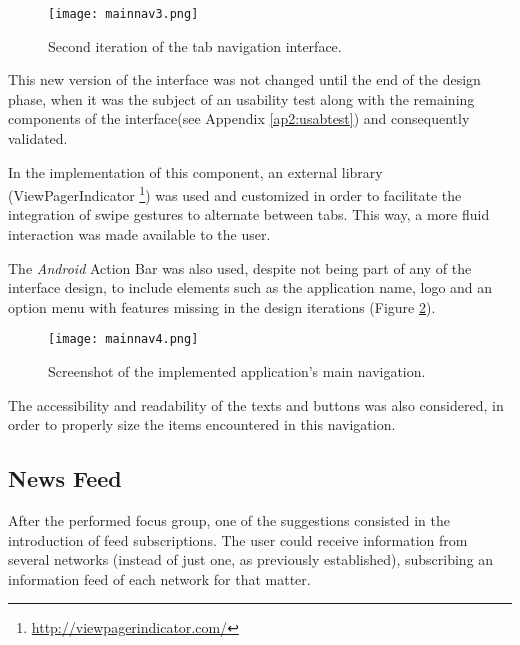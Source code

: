 \begin{figure}[h!]
  \begin{center}
    \leavevmode
    \texttt{[image: mainnav3.png]}
    \caption{Second iteration of the tab navigation interface.}
    \label{fig:mainnav3}
  \end{center}
\end{figure}

This new version of the interface was not changed until the end of the design phase, when it was the subject of an usability test along with the remaining components of the interface(see Appendix \ref{ap2:usabtest}) and consequently validated.

In the implementation of this component, an external library (ViewPagerIndicator \footnote{\url{http://viewpagerindicator.com/}}) was used and customized in order to facilitate the integration of swipe gestures to alternate between tabs. This way, a more fluid interaction was made available to the user.

The \emph{Android} Action Bar was also used, despite not being part of any of the interface design, to include elements such as the application name, logo and an option menu with features missing in the design iterations (Figure \ref{fig:mainnav4}).

\begin{figure}[h!]
  \begin{center}
    \leavevmode
    \texttt{[image: mainnav4.png]}
    \caption{Screenshot of the implemented application's main navigation.}
    \label{fig:mainnav4}
  \end{center}
\end{figure}

The accessibility and readability of the texts and buttons was also considered, in order to properly size the items encountered in this navigation.

\subsection{News Feed}\label{newsfeed}

After the performed focus group, one of the suggestions consisted in the introduction of feed subscriptions. The user could receive information from several networks (instead of just one, as previously established), subscribing an information feed of each network for that matter. 

